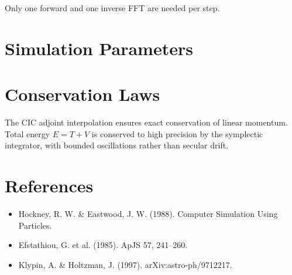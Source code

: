 Only one forward and one inverse FFT are needed per step.

\section{Simulation Parameters}


\section{Conservation Laws}

The CIC adjoint interpolation ensures exact conservation of linear
momentum. Total energy $E = T + V$ is conserved to high precision
by the symplectic integrator, with bounded oscillations rather than
secular drift.

\section{References}

\begin{itemize}
\item Hockney, R. W. \& Eastwood, J. W. (1988). Computer Simulation Using Particles.
\item Efstathiou, G. et al. (1985). ApJS 57, 241--260.
\item Klypin, A. \& Holtzman, J. (1997). arXiv:astro-ph/9712217.
\end{itemize}
